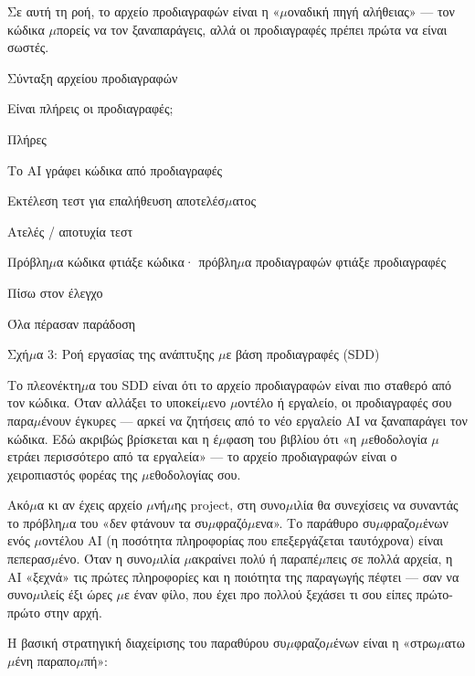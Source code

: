 Σε αυτή τη ροή, το αρχείο προδιαγραφών είναι η «$\mu$οναδική πηγή αλήθειας» — τον κώδικα $\mu$πορείς να τον ξαναπαράγεις, αλλά οι προδιαγραφές πρέπει πρώτα να είναι σωστές.

Σύνταξη αρχείου προδιαγραφών

Είναι πλήρεις οι προδιαγραφές;

Πλήρες

Το AI γράφει κώδικα από προδιαγραφές

Εκτέλεση τεστ για επαλήθευση αποτελέσ$\mu$ατος

Ατελές / αποτυχία τεστ

Πρόβλη$\mu$α κώδικα φτιάξε κώδικα· πρόβλη$\mu$α προδιαγραφών φτιάξε προδιαγραφές

Πίσω στον έλεγχο

Όλα πέρασαν παράδοση

\begin{center}\small\color{gray}Σχή$\mu$α 3: Ροή εργασίας της ανάπτυξης $\mu$ε βάση προδιαγραφές (SDD)\end{center}

Το πλεονέκτη$\mu$α του SDD είναι ότι το αρχείο προδιαγραφών είναι πιο σταθερό από τον κώδικα. Όταν αλλάξει το υποκεί$\mu$ενο $\mu$οντέλο ή εργαλείο, οι προδιαγραφές σου παρα$\mu$ένουν έγκυρες — αρκεί να ζητήσεις από το νέο εργαλείο AI να ξαναπαράγει τον κώδικα. Εδώ ακριβώς βρίσκεται και η έ$\mu$φαση του βιβλίου ότι «η $\mu$εθοδολογία $\mu$ετράει περισσότερο από τα εργαλεία» — το αρχείο προδιαγραφών είναι ο χειροπιαστός φορέας της $\mu$εθοδολογίας σου.


Ακό$\mu$α κι αν έχεις αρχείο $\mu$νή$\mu$ης project, στη συνο$\mu$ιλία θα συνεχίσεις να συναντάς το πρόβλη$\mu$α του «δεν φτάνουν τα συ$\mu$φραζό$\mu$ενα». Το παράθυρο συ$\mu$φραζο$\mu$ένων ενός $\mu$οντέλου AI (η ποσότητα πληροφορίας που επεξεργάζεται ταυτόχρονα) είναι πεπερασ$\mu$ένο. Όταν η συνο$\mu$ιλία $\mu$ακραίνει πολύ ή παραπέ$\mu$πεις σε πολλά αρχεία, η AI «ξεχνά» τις πρώτες πληροφορίες και η ποιότητα της παραγωγής πέφτει — σαν να συνο$\mu$ιλείς έξι ώρες $\mu$ε έναν φίλο, που έχει προ πολλού ξεχάσει τι σου είπες πρώτο-πρώτο στην αρχή.

Η βασική στρατηγική διαχείρισης του παραθύρου συ$\mu$φραζο$\mu$ένων είναι η «στρω$\mu$ατω$\mu$ένη παραπο$\mu$πή»:

